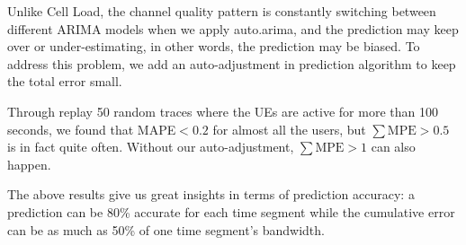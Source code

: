 Unlike Cell Load, the channel quality pattern is constantly switching between different ARIMA models when we apply auto.arima, and the prediction may keep over or under-estimating, in other words, the prediction may be biased. To address this problem, we add an auto-adjustment in prediction algorithm to keep the total error small. 

Through replay 50 random traces where the UEs are active for more than 100 seconds, we found that MAPE$<0.2$ for almost all the users, but $\sum\text{MPE}>0.5$ is in fact quite often. Without our auto-adjustment, $\sum\text{MPE}>1$ can also happen. 

The above results give us great insights in terms of prediction accuracy: a prediction can be 80\% accurate for each time segment while the cumulative error can be as much as 50\% of one time segment's bandwidth. 










